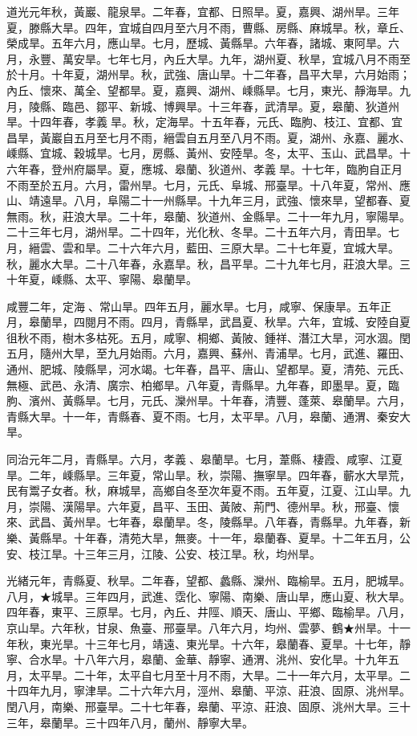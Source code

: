 \begin{pinyinscope}
道光元年秋，黃巖、龍泉旱。二年春，宜都、日照旱。夏，嘉興、湖州旱。三年夏，滕縣大旱。四年，宜城自四月至六月不雨，曹縣、房縣、麻城旱。秋，章丘、榮成旱。五年六月，應山旱。七月，歷城、黃縣旱。六年春，諸城、東阿旱。六月，永豐、萬安旱。七年七月，內丘大旱。九年，湖州夏、秋旱，宜城八月不雨至於十月。十年夏，湖州旱。秋，武強、唐山旱。十二年春，昌平大旱，六月始雨；內丘、懷來、萬全、望都旱。夏，嘉興、湖州、嵊縣旱。七月，東光、靜海旱。九月，陵縣、臨邑、鄒平、新城、博興旱。十三年春，武清旱。夏，皋蘭、狄道州旱。十四年春，孝義旱。秋，定海旱。十五年春，元氏、臨朐、枝江、宜都、宜昌旱，黃巖自五月至七月不雨，縉雲自五月至八月不雨。夏，湖州、永嘉、麗水、嵊縣、宜城、穀城旱。七月，房縣、黃州、安陸旱。冬，太平、玉山、武昌旱。十六年春，登州府屬旱。夏，應城、皋蘭、狄道州、孝義旱。十七年，臨朐自正月不雨至於五月。六月，雷州旱。七月，元氏、阜城、邢臺旱。十八年夏，常州、應山、靖遠旱。八月，阜陽二十一州縣旱。十九年三月，武強、懷來旱，望都春、夏無雨。秋，莊浪大旱。二十年，皋蘭、狄道州、金縣旱。二十一年九月，寧陽旱。二十三年七月，湖州旱。二十四年，光化秋、冬旱。二十五年六月，青田旱。七月，縉雲、雲和旱。二十六年六月，藍田、三原大旱。二十七年夏，宜城大旱。秋，麗水大旱。二十八年春，永嘉旱。秋，昌平旱。二十九年七月，莊浪大旱。三十年夏，嵊縣、太平、寧陽、皋蘭旱。

咸豐二年，定海、常山旱。四年五月，麗水旱。七月，咸寧、保康旱。五年正月，皋蘭旱，四閱月不雨。四月，青縣旱，武昌夏、秋旱。六年，宜城、安陸自夏徂秋不雨，樹木多枯死。五月，咸寧、桐鄉、黃陂、鍾祥、潛江大旱，河水涸。閏五月，隨州大旱，至九月始雨。六月，嘉興、蘇州、青浦旱。七月，武進、羅田、通州、肥城、陵縣旱，河水竭。七年春，昌平、唐山、望都旱。夏，清苑、元氏、無極、武邑、永清、廣宗、柏鄉旱。八年夏，青縣旱。九年春，即墨旱。夏，臨朐、濱州、黃縣旱。七月，元氏、灤州旱。十年春，清豐、蓬萊、皋蘭旱。六月，青縣大旱。十一年，青縣春、夏不雨。七月，太平旱。八月，皋蘭、通渭、秦安大旱。

同治元年二月，青縣旱。六月，孝義、皋蘭旱。七月，葦縣、棲霞、咸寧、江夏旱。二年，嵊縣旱。三年夏，常山旱。秋，崇陽、撫寧旱。四年春，蘄水大旱荒，民有鬻子女者。秋，麻城旱，高鄉自冬至次年夏不雨。五年夏，江夏、江山旱。九月，崇陽、漢陽旱。六年夏，昌平、玉田、黃陂、荊門、德州旱。秋，邢臺、懷來、武昌、黃州旱。七年春，皋蘭旱。冬，陵縣旱。八年春，青縣旱。九年春，新樂、黃縣旱。十年春，清苑大旱，無麥。十一年，皋蘭春、夏旱。十二年五月，公安、枝江旱。十三年三月，江陵、公安、枝江旱。秋，均州旱。

光緒元年，青縣夏、秋旱。二年春，望都、蠡縣、灤州、臨榆旱。五月，肥城旱。八月，★城旱。三年四月，武進、霑化、寧陽、南樂、唐山旱，應山夏、秋大旱。四年春，東平、三原旱。七月，內丘、井陘、順天、唐山、平鄉、臨榆旱。八月，京山旱。六年秋，甘泉、魚臺、邢臺旱。八年六月，均州、雲夢、鶴★州旱。十一年秋，東光旱。十三年七月，靖遠、東光旱。十六年，皋蘭春、夏旱。十七年，靜寧、合水旱。十八年六月，皋蘭、金華、靜寧、通渭、洮州、安化旱。十九年五月，太平旱。二十年，太平自七月至十月不雨，大旱。二十一年六月，太平旱。二十四年九月，寧津旱。二十六年六月，涇州、皋蘭、平涼、莊浪、固原、洮州旱。閏八月，南樂、邢臺旱。二十七年春，皋蘭、平涼、莊浪、固原、洮州大旱。三十三年，皋蘭旱。三十四年八月，蘭州、靜寧大旱。


\end{pinyinscope}
